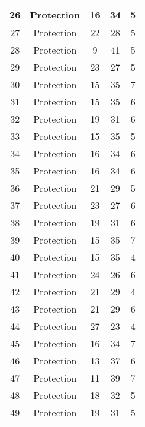 \documentclass[results.tex]{subfiles}
\begin{document}
\begin{center}
\begin{tabular}{| c || c | c | c | c |}
    \hline
    26 & Protection & 16 & 34 & 5 \\ 
    \hline
    27 & Protection & 22 & 28 & 5 \\ 
    \hline
    28 & Protection & 9 & 41 & 5 \\ 
    \hline
    29 & Protection & 23 & 27 & 5 \\ 
    \hline
    30 & Protection & 15 & 35 & 7 \\ 
    \hline
    31 & Protection & 15 & 35 & 6 \\ 
    \hline
    32 & Protection & 19 & 31 & 6 \\ 
    \hline
    33 & Protection & 15 & 35 & 5 \\ 
    \hline
    34 & Protection & 16 & 34 & 6 \\ 
    \hline
    35 & Protection & 16 & 34 & 6 \\ 
    \hline
    36 & Protection & 21 & 29 & 5 \\ 
    \hline
    37 & Protection & 23 & 27 & 6 \\ 
    \hline
    38 & Protection & 19 & 31 & 6 \\ 
    \hline
    39 & Protection & 15 & 35 & 7 \\ 
    \hline
    40 & Protection & 15 & 35 & 4 \\ 
    \hline
    41 & Protection & 24 & 26 & 6 \\ 
    \hline
    42 & Protection & 21 & 29 & 4 \\ 
    \hline
    43 & Protection & 21 & 29 & 6 \\ 
    \hline
    44 & Protection & 27 & 23 & 4 \\ 
    \hline
    45 & Protection & 16 & 34 & 7 \\ 
    \hline
    46 & Protection & 13 & 37 & 6 \\ 
    \hline
    47 & Protection & 11 & 39 & 7 \\ 
    \hline
    48 & Protection & 18 & 32 & 5 \\ 
    \hline
    49 & Protection & 19 & 31 & 5 \\ 
    \hline   \end{tabular}
\end{center}
\end{document}
